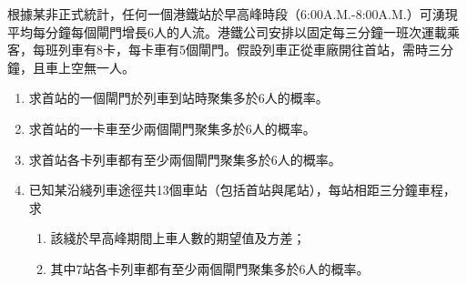 \documentclass[12pt]{article}
\begin{document}
    根據某非正式統計，任何一個港鐵站於早高峰時段（6:00A.M.-8:00A.M.）可湧現平均每分鐘每個閘門增長6人的人流。港鐵公司安排以固定每三分鐘一班次運載乘客，每班列車有8卡，每卡車有5個閘門。假設列車正從車廠開往首站，需時三分鐘，且車上空無一人。
    \begin{enumerate}
        \item 求首站的一個閘門於列車到站時聚集多於6人的概率。
        \item 求首站的一卡車至少兩個閘門聚集多於6人的概率。
        \item 求首站各卡列車都有至少兩個閘門聚集多於6人的概率。
        \item 已知某沿綫列車途徑共13個車站（包括首站與尾站），每站相距三分鐘車程，求\begin{enumerate}
            \item 該綫於早高峰期間上車人數的期望值及方差；
            \item 其中7站各卡列車都有至少兩個閘門聚集多於6人的概率。
        \end{enumerate}
    \end{enumerate}
\end{document}
